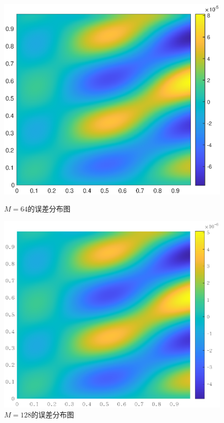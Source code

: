 \documentclass[lang=cn,10pt,bibend=bibtex]{elegantbook}
\begin{document}
\begin{figure}[H]
  \centering
  \begin{minipage}[t]{0.49\linewidth}
      \centering
      \includegraphics[width=0.9\linewidth]{figure/test1_error64.eps}
      \caption*{$M=64$的误差分布图}
  \end{minipage}
  \begin{minipage}[t]{0.49\linewidth}
    \centering
    \includegraphics[width=0.9\linewidth]{figure/test1_error128.eps}
      \caption*{$M=128$的误差分布图}
  \end{minipage}
\end{figure}
\end{document}
